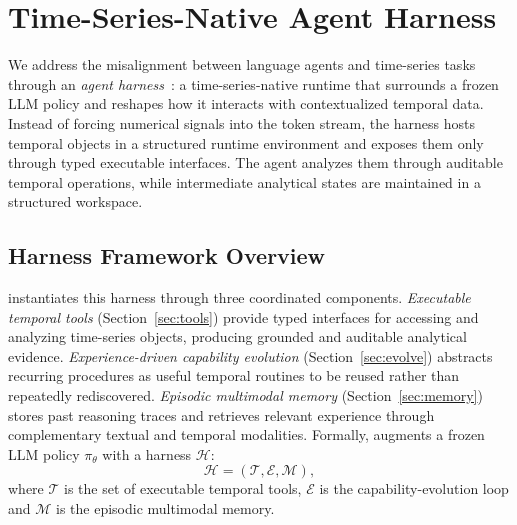 \section{Time-Series-Native Agent Harness}
\label{sec:method}

We address the misalignment between language agents and time-series tasks through an \textit{agent harness}~\cite{ning2026code}: a time-series-native runtime that surrounds a frozen LLM policy and reshapes how it interacts with contextualized temporal data. Instead of forcing numerical signals into the token stream, the harness hosts temporal objects in a structured runtime environment and exposes them only through typed executable interfaces. The agent analyzes them through auditable temporal operations, while intermediate analytical states are maintained in a structured workspace.

\subsection{Harness Framework Overview}
\label{sec:overview}

\method instantiates this harness through three coordinated components. \textit{Executable temporal tools} (Section~\ref{sec:tools}) provide typed interfaces for accessing and analyzing time-series objects, producing grounded and auditable analytical evidence. \textit{Experience-driven capability evolution} (Section~\ref{sec:evolve}) abstracts recurring procedures as useful temporal routines to be reused rather than repeatedly rediscovered. \emph{Episodic multimodal memory} (Section~\ref{sec:memory}) stores past reasoning traces and retrieves relevant experience through complementary textual and temporal modalities.
Formally, \method augments a frozen LLM policy $\pi_\theta$ with a harness $\mathcal{H}$:
\begin{equation}
    \mathcal{H} = (\mathcal{T}, \mathcal{E}, \mathcal{M} ),
\end{equation}
where $\mathcal{T}$ is the set of executable temporal tools, $\mathcal{E}$ is the capability-evolution loop and $\mathcal{M}$ is the episodic multimodal memory.

